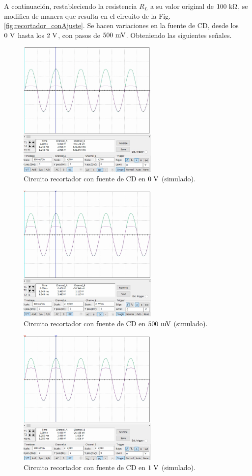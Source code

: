 \documentclass[journal]{IEEEtran}
\begin{document}
A continuación, restableciendo la resistencia $R_L$ a su valor original de $100~\textnormal{k}\Omega$, se modifica de manera que resulta en el circuito de la Fig. \ref{fig:recortador_conAjuste}.
Se hacen variaciones en la fuente de CD, desde los $0~\textnormal{V}$ hasta los $2~\textnormal{V}$, con pasos de $500~\textnormal{mV}$. Obteniendo las siguientes señales.

\begin{figure}[H]
        \centering
        \includegraphics[width=2.7in]{SignalSimulated_05.png}
        \caption{Circuito recortador con fuente de CD en $0~\textnormal{V}$ (simulado).}
        \label{fig:SignalSimulated_05}
\end{figure}
\vspace{-0.5cm}
\begin{figure}[H]
        \centering
        \includegraphics[width=2.7in]{SignalSimulated_06.png}
        \caption{Circuito recortador con fuente de CD en $500~\textnormal{mV}$ (simulado).}
        \label{fig:SignalSimulated_06}
\end{figure}
\begin{figure}[H]
        \centering
        \includegraphics[width=2.7in]{SignalSimulated_07.png}
        \caption{Circuito recortador con fuente de CD en $1~\textnormal{V}$ (simulado).}
        \label{fig:SignalSimulated_07}
\end{figure}
\end{document}
